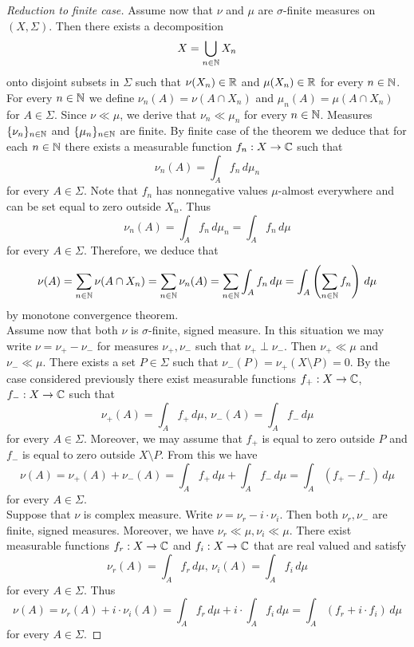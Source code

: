 \begin{proof}[Reduction to finite case]
Assume now that $\nu$ and $\mu$ are $\sigma$-finite measures on $(X,\Sigma)$. Then there exists a decomposition
$$X= \bigcup_{n\in {\mathbb N}}X_n$$
onto disjoint subsets in $\Sigma$ such that $\nu(X_n)\in {\mathbb R}$ and $\mu(X_n)\in {\mathbb R}$ for every $n\in {\mathbb N}$. For every $n\in {\mathbb N}$ we define $\nu_n(A) = \nu(A\cap X_n)$ and $\mu_n(A) = \mu(A\cap X_n)$ for $A\in \Sigma$. Since $\nu \ll \mu$, we derive that $\nu_n\ll \mu_n$ for every $n\in {\mathbb N}$. Measures $\{\nu_n\}_{n\in {\mathbb N}}$ and $\{\mu_n\}_{n\in {\mathbb N}}$ are finite. By finite case of the theorem we deduce that for each $n\in {\mathbb N}$ there exists a measurable function $f_n:X\rightarrow {\mathbb C}$ such that
$$\nu_n(A) = \int_A f_n\,d\mu_n$$
for every $A\in \Sigma$. Note that $f_n$ has nonnegative values $\mu$-almost everywhere and can be set equal to zero outside $X_n$. Thus
$$\nu_n(A) = \int_A f_n\,d\mu_n = \int_A f_n\,d\mu$$
for every $A\in \Sigma$. Therefore, we deduce that
$$\nu(A) = \sum_{n\in {\mathbb N}}\nu(A\cap X_n) = \sum_{n\in {\mathbb N}}\nu_n(A) =\sum_{n\in {\mathbb N}}\int_Af_n\,d\mu = \int_A \left(\sum_{n\in {\mathbb N}}f_n\right)\,d\mu$$
by monotone convergence theorem.\\
Assume now that both $ \nu$ is $\sigma$-finite, signed measure. In this situation we may write $\nu = \nu_+-\nu_-$ for measures $\nu_+, \nu_-$ such that $\nu_+\perp \nu_-$. Then $\nu_+ \ll \mu$ and $\nu_-\ll \mu$.  There exists a set $P\in \Sigma$ such that $\nu_-(P)=\nu_+(X\setminus P)=0$. By the case considered previously there exist measurable functions $f_+:X\rightarrow {\mathbb C}$, $f_-:X\rightarrow {\mathbb C}$ such that
$$\nu_+(A) = \int_Af_+\,d\mu,\,\nu_-(A) = \int_Af_-\,d\mu$$
for every $A\in \Sigma$. Moreover, we may assume that $f_+$ is equal to zero outside $P$ and $f_-$ is equal to zero outside $X\setminus P$. From this we have
$$\nu(A) = \nu_+(A) + \nu_-(A) = \int_Af_+\,d\mu + \int_Af_-\,d\mu = \int_A\left(f_+-f_-\right)\,d\mu $$
for every $A\in \Sigma$.\\
Suppose that $\nu$ is complex measure. Write $\nu = \nu_r - i\cdot \nu_i$. Then both $\nu_r, \nu_-$ are finite, signed measures. Moreover, we have $\nu_r\ll\mu,\nu_i\ll \mu$. There exist measurable functions $f_r:X\rightarrow {\mathbb C}$ and $f_i:X\rightarrow {\mathbb C}$ that are real valued and satisfy
$$\nu_r(A) = \int_Af_r\,d\mu,\,\nu_i(A) = \int_Af_i\,d\mu$$
for every $A\in \Sigma$. Thus
$$\nu(A) = \nu_r(A) + i\cdot \nu_i(A) = \int_Af_r\,d\mu + i\cdot \int_Af_i\,d\mu = \int_A\left(f_r+i\cdot f_i\right)\,d\mu$$
for every $A\in \Sigma$.
\end{proof}


